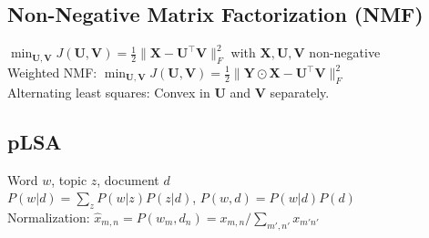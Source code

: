 \documentclass[a4paper, 11pt, landscape]{article}
\begin{document}
\begin{multicols*}{3}
\section{Non-Negative Matrix Factorization (NMF)}
$\min_{\mathbf{U,V}} J(\mathbf{U,V}) = \frac{1}{2}\|\mathbf{X}-\mathbf{U}^\top \mathbf{V}\|^2_F$ with $\mathbf{X,U,V}$ non-negative\\
Weighted NMF: $\min_{\mathbf{U,V}} J(\mathbf{U,V}) = \frac{1}{2}\|\mathbf{Y} \odot \mathbf{X}-\mathbf{U}^\top \mathbf{V}\|^2_F$\\
Alternating least squares: Convex in $\mathbf{U}$ and $\mathbf{V}$ separately.


\subsection{pLSA}
Word $w$, topic $z$, document $d$\\
$P(w|d) = \sum_{z}P(w|z)P(z|d)$, $P(w,d) = P(w|d)P(d)$\\
Normalization: $\hat{x}_{m,n} = P(w_m,d_n)=x_{m,n}/\sum_{m',n'}x_{m'n'}$


\end{multicols*}
\end{document}
